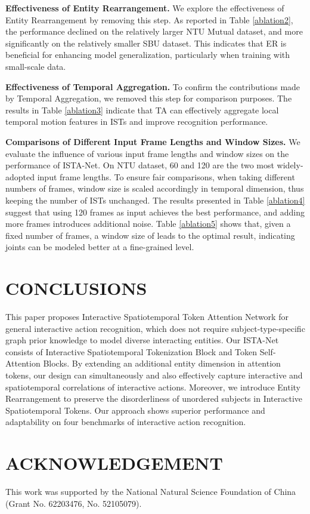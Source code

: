 \documentclass[letterpaper, 10 pt, conference]{ieeeconf}
\begin{document}
\textbf{Effectiveness of Entity Rearrangement.} We explore the effectiveness of Entity Rearrangement by removing this step. As reported in Table \ref{ablation2}, the performance declined on the relatively larger NTU Mutual dataset, and more significantly on the relatively smaller SBU dataset. This indicates that ER is beneficial for enhancing model generalization, particularly when training with small-scale data.

\textbf{Effectiveness of Temporal Aggregation.} To confirm the contributions made by Temporal Aggregation, we removed this step for comparison purposes. The results in Table \ref{ablation3} indicate that TA can effectively aggregate local temporal motion features in ISTs and improve recognition performance.

\textbf{Comparisons of Different Input Frame Lengths and Window Sizes.} We evaluate the influence of various input frame lengths and window sizes on the performance of ISTA-Net. On NTU dataset, 60 and 120 are the two most widely-adopted input frame lengths. To ensure fair comparisons, when taking different numbers of frames, window size is scaled accordingly in temporal dimension, thus keeping the number of ISTs unchanged. The results presented in Table \ref{ablation4} suggest that using 120 frames as input achieves the best performance, and adding more frames introduces additional noise. Table \ref{ablation5} shows that, given a fixed number of frames, a window size of  leads to the optimal result, indicating joints can be modeled better at a fine-grained level.

\section{CONCLUSIONS}

This paper proposes Interactive Spatiotemporal Token Attention Network for general interactive action recognition, which does not require subject-type-specific graph prior knowledge to model diverse interacting entities. Our ISTA-Net consists of Interactive Spatiotemporal Tokenization Block and Token Self-Attention Blocks. By extending an additional entity dimension in attention tokens, our design can simultaneously and also effectively capture interactive and spatiotemporal correlations of interactive actions. Moreover, we introduce Entity Rearrangement to preserve the disorderliness of unordered subjects in Interactive Spatiotemporal Tokens. Our approach shows superior performance and adaptability on four benchmarks of interactive action recognition.

\section{ACKNOWLEDGEMENT}
This work was supported by the National Natural Science Foundation of China (Grant No. 62203476, No. 52105079).

\addtolength{\textheight}{-1.5cm}   






\normalem


\end{document}
